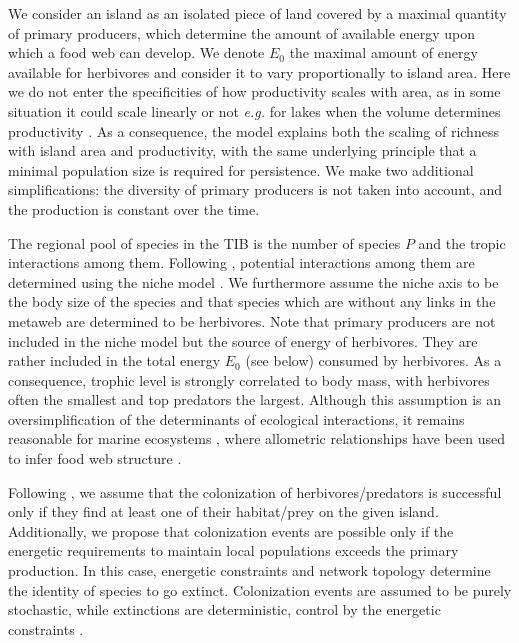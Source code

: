 We consider an island as an isolated piece of land covered by a maximal
quantity of primary producers, which determine the amount of available
energy upon which a food web can develop. We denote \(E_0\) the maximal
amount of energy available for herbivores and consider it to vary
proportionally to island area. Here we do not enter the specificities of
how productivity scales with area, as in some situation it could scale
linearly or not \emph{e.g.} for lakes when the volume determines
productivity \citep{Post2000}. As a consequence, the model explains both
the scaling of richness with island area and productivity, with the same
underlying principle that a minimal population size is required for
persistence. We make two additional simplifications: the diversity of
primary producers is not taken into account, and the production is
constant over the time.

The regional pool of species in the TIB is the number of species \(P\)
and the tropic interactions among them. Following \citet{Cazelles2016a},
potential interactions among them are determined using the niche model
\citep{Williams2000}. We furthermore assume the niche axis to be the
body size of the species \citep{Gravel2013} and that species which are
without any links in the metaweb are determined to be herbivores. Note
that primary producers are not included in the niche model but the
source of energy of herbivores. They are rather included in the total
energy \(E_0\) (see below) consumed by herbivores. As a consequence,
trophic level is strongly correlated to body mass, with herbivores often
the smallest and top predators the largest. Although this assumption is
an oversimplification of the determinants of ecological interactions, it
remains reasonable for marine ecosystems \citep{Trebilco2013}, where
allometric relationships have been used to infer food web structure
\citep{Gravel2013}.

Following \citet{Gravel2011}, we assume that the colonization of
herbivores/predators is successful only if they find at least one of
their habitat/prey on the given island. Additionally, we propose that
colonization events are possible only if the energetic requirements to
maintain local populations exceeds the primary production. In this case,
energetic constraints and network topology determine the identity of
species to go extinct. Colonization events are assumed to be purely
stochastic, while extinctions are deterministic, control by the
energetic constraints \citep[this difference in stochastic nature
between these fundamental processes of biogeography has been recently
supported in][ where the authors show that extinction probability
decreases with the presence of resource/prey on the
island]{Cirtwill2015}.

